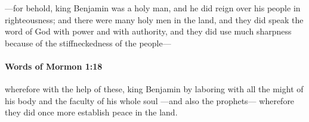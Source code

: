 			---for behold, king Benjamin was a holy man,
			and he did reign over his people in righteousness;
			and there were many holy men in the land,
			and they did speak the word of God with power and with authority,
			and they did use much sharpness because of the stiffneckedness of the people---

		\paragraph{Words of Mormon 1:18} %
			\label{WORDSOFMORMON-1-18}

			wherefore with the help of these,
			king Benjamin by laboring with all the might of his body
			and the faculty of his whole soul
			---and also the prophets---
			wherefore they did once more establish peace in the land.